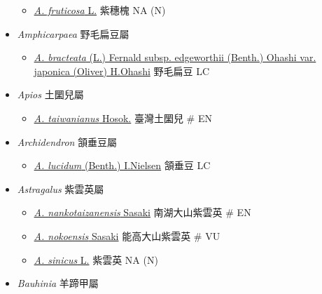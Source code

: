 \begin{itemize}
  \begin{itemize}
        \item[] \href{http://www.theplantlist.org/tpl1.1/search?q=Amorpha+fruticosa}{\textit{A. fruticosa} L.}   紫穗槐   NA (N)
  \end{itemize}
 \item[] \textit{Amphicarpaea} 野毛扁豆屬
                                
  \begin{itemize}
        \item[] \href{http://www.theplantlist.org/tpl1.1/search?q=Amphicarpaea+bracteata+subsp.+edgeworthii+var.+japonica}{\textit{A. bracteata} (L.) Fernald subsp. edgeworthii (Benth.) Ohashi var. japonica (Oliver) H.Ohashi}   野毛扁豆   LC
  \end{itemize}
 \item[] \textit{Apios} 土圞兒屬
                                
  \begin{itemize}
        \item[] \href{http://www.theplantlist.org/tpl1.1/search?q=Apios+taiwanianus}{\textit{A. taiwanianus} Hosok.}   臺灣土圞兒  \# EN
  \end{itemize}
 \item[] \textit{Archidendron} 頷垂豆屬
                                
  \begin{itemize}
        \item[] \href{http://www.theplantlist.org/tpl1.1/search?q=Archidendron+lucidum}{\textit{A. lucidum} (Benth.) I.Nielsen}   頷垂豆   LC
  \end{itemize}
 \item[] \textit{Astragalus} 紫雲英屬
                                
  \begin{itemize}
        \item[] \href{http://www.theplantlist.org/tpl1.1/search?q=Astragalus+nankotaizanensis}{\textit{A. nankotaizanensis} Sasaki}   南湖大山紫雲英  \# EN
        \item[] \href{http://www.theplantlist.org/tpl1.1/search?q=Astragalus+nokoensis}{\textit{A. nokoensis} Sasaki}   能高大山紫雲英  \# VU
        \item[] \href{http://www.theplantlist.org/tpl1.1/search?q=Astragalus+sinicus}{\textit{A. sinicus} L.}   紫雲英   NA (N)
  \end{itemize}
 \item[] \textit{Bauhinia} 羊蹄甲屬
                                

\end{itemize}
